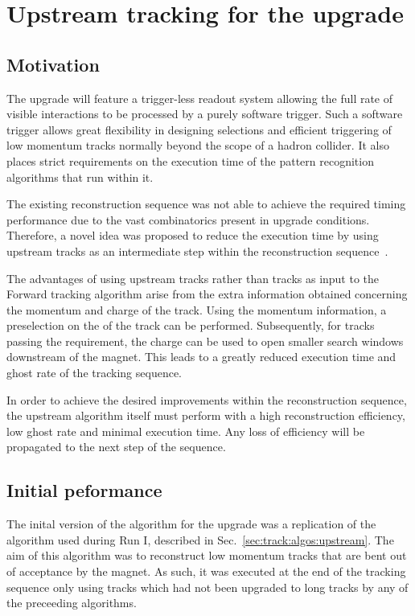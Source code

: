 \section{Upstream tracking for the \lhcb upgrade}
\label{sec:up-track-upgrade}

\subsection{Motivation}
\label{sec:up-track-upgrade:motivation}

The \lhcb upgrade will feature a trigger-less readout system allowing the full rate of visible interactions to be processed by a purely software trigger. Such a software trigger allows great flexibility in designing selections and efficient triggering of low momentum tracks normally beyond the scope of a hadron collider. It also places strict requirements on the execution time of the pattern recognition algorithms that run within it.

The existing reconstruction sequence was not able to achieve the required timing performance due to the vast combinatorics present in upgrade conditions. Therefore, a novel idea was proposed to reduce the execution time by using upstream tracks as an intermediate step within the reconstruction sequence~\cite{velout}.

The advantages of using upstream tracks rather than \velo tracks as input to the Forward tracking algorithm arise from the extra information obtained concerning the momentum and charge of the track. Using the momentum information, a preselection on the \pt of the track can be performed. Subsequently, for tracks passing the \pt requirement, the charge can be used to open smaller search windows downstream of the magnet. This leads to a greatly reduced execution time and ghost rate of the tracking sequence.

In order to achieve the desired improvements within the reconstruction sequence, the upstream algorithm itself must perform with a high reconstruction efficiency, low ghost rate and minimal execution time. Any loss of efficiency will be propagated to the next step of the sequence. 

\subsection{Initial peformance}

The inital version of the \velout algorithm for the \lhcb upgrade was a replication of the \velott algorithm used during Run I, described in Sec.~\ref{sec:track:algos:upstream}. The aim of this \velott algorithm was to reconstruct low momentum tracks that are bent out of acceptance by the magnet. As such, it was executed at the end of the tracking sequence only using \velo tracks which had not been upgraded to long tracks by any of the preceeding algorithms.

